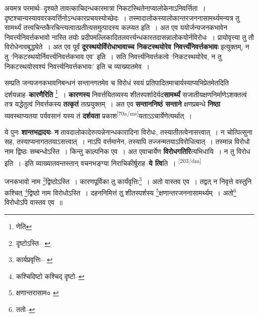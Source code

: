 \documentclass[article,12pt,a4paper]{memoir}
\begin{document}
	  \pstart अयमत्र परमार्थः--दृश्यते तावत्काचिदन्धकारमात्रा निकटस्थितेनाप्यालोकेनाऽनिवर्त्तिता । दृष्टश्चान्यस्याववरकवर्त्तिनोऽन्धकारप्रचयस्योच्छेदः । तस्मादालोकस्यालोकान्तरजननासामर्थ्यमन्यत्र तु सामर्थ्यं तत्त्वचिन्तकैरचिन्त्यत्वात्प्रतीत्यसमुत्पादस्य कल्प्यत इति । अत एव ययोर्जन्यजनकभावेन निवर्त्त्यनिवर्त्तकभावो नास्ति तयोः प्रदीपमल्लिकादितलवर्त्त्यन्धकारतदासन्नालोकयोर्नविरोधः । प्रायोवृत्त्या तु तौ विरोधेनावबुद्ध्येते । अत एव पूर्वं \textbf{दूरस्थयोर्विंरोधाभावाच्च निकटस्थयोरेव निवर्त्त्यंनिवर्त्तकभावः\textbf{}} इत्युक्तम्, न तु ‘निकटस्थयोर्निवर्त्त्यनिवर्त्तकभाव एव’ इति । सति निवर्त्त्यनिवर्त्तकत्वे ‘निकटस्थयोरेव, न तु निकटस्थयोरवश्यं निवर्त्त्यनिवर्त्तकभावः’ इति च व्याख्यातमेव ।
	\pend
      

	  \pstart सम्प्रति जन्यजनकभावनिबन्धनं सन्तानगतमेव च विरोधं स्वयं प्रतिपादितमाचार्यस्याप्यभिप्रेतमेतदिति दर्शयन्नाह--\textbf{कारणैरिति} \footnote{णेति} । \textbf{कारणस्य} निवर्त्तयितव्यस्य शीतस्पर्शादेर्यद\textbf{सामर्थ्यं} सजातीयक्षणनिर्माणेऽशक्तत्वं तत्र यद्धेतुत्वं निवर्त्तकस्य \textbf{तत्कृतं} तत्प्रयुक्तम् । अत एव \textbf{सन्ताननिष्ठं सन्ताने} क्षणप्रबन्धे \textbf{निष्ठा} व्यवस्थाप्यतया पर्यवसानं यस्य तं \textbf{दर्शयता} प्रकाश\leavevmode\textsuperscript{\rmlatinfont\tiny [70a/ms]}यताऽऽचार्येणेत्यर्थात् ।
	\pend
      

	  \pstart ये पुनः \textbf{शान्तभद्रादयः}--\textbf{न} तावदालोकादेरुत्पन्नेनान्धकारादिना विरोधः, तस्यातीतत्वेनासत्त्वात् । न चोत्पित्सुना सह, तस्याप्यनागततयाऽसत्त्वात् । नाऽपि वर्त्तमानेन, तस्यापि तज्जन्मतयाऽविरोधित्वात् । तस्मान्न विरोधो नाम द्विष्ठः सम्बन्धोऽस्ति । किन्तु काल्पनिक एव । अत एवाचार्येण \textbf{विरोधगतिरि}त्यभिधायि । न तु विरोध इति ।--इति व्याख्यातवन्तस्तान् वचनभङ्ग्या निराचिकीर्षुराह--\textbf{ये त्वि}ति ।
	\pend
      \leavevmode\textsuperscript{\rmlatinfont\tiny [203/dm]}

	  \pstart जनकभावो नाम \footnote{दृष्टोऽस्ति--\cite{dp-msA} \cite{dp-msB} \cite{dp-edP} \cite{dp-edH} \cite{dp-edE} \cite{dp-edN}}द्विष्ठोऽस्ति । कारणपूर्विका तु कार्यंवृत्तिः\footnote{कार्यप्रवृत्तिः--\cite{dp-msA} \cite{dp-msB} \cite{dp-msC} \cite{dp-msD} \cite{dp-edP} \cite{dp-edH} \cite{dp-edE} \cite{dp-edN}} । अतो वास्तव एव । तद्वत् न निवृत्ते वस्तुनि कश्चित् \footnote{कश्चिदिष्टो \cite{dp-msA} \cite{dp-msB} \cite{dp-edP} \cite{dp-edH} \cite{dp-edN} कश्चिद् दृष्टो--\cite{dp-edE}}द्विष्ठो नाम विरोधोऽस्ति । दहननिमित्तं तु शीतस्पर्शस्य \footnote{क्षणान्तरासाम० \cite{dp-msA} \cite{dp-msB} \cite{dp-edP} \cite{dp-edH} \cite{dp-edE} \cite{dp-edN}}क्षणान्तरजननासामर्थ्यम् । अतो\footnote{ततो--\cite{dp-msC}} विरोधोऽपि वास्तव एव ॥
	\pend
       
\end{document}
